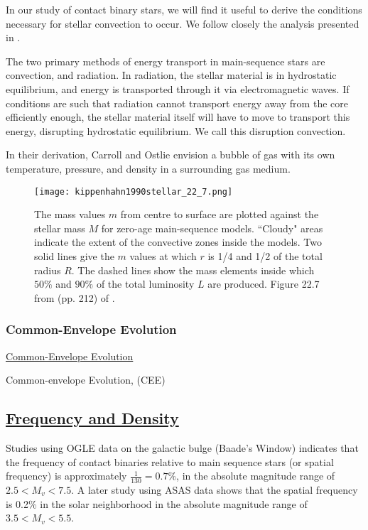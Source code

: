 \documentclass[12pt]{article} %
\numberwithin{equation}{section} %
\begin{document}
In our study of contact binary stars, we will find it useful to derive the conditions necessary for stellar convection to occur. We follow closely the analysis presented in \citet{carroll2006introduction}.

The two primary methods of energy transport in main-sequence stars are convection, and radiation. In radiation, the stellar material is in hydrostatic equilibrium, and energy is transported through it via electromagnetic waves. If conditions are such that radiation cannot transport energy away from the core efficiently enough, the stellar material itself will have to move to transport this energy, disrupting hydrostatic equilibrium. We call this disruption convection. 

In their derivation, Carroll and Ostlie envision a bubble of gas with its own temperature, pressure, and density in a surrounding gas medium. 

\begin{figure}[H]
\centering
\texttt{[image: kippenhahn1990stellar\_22\_7.png]}
\caption{The mass values $m$ from centre to surface are plotted against the stellar mass $M$ for zero-age main-sequence models. ``Cloudy" areas indicate the extent of the convective zones inside the models. Two solid lines give the $m$ values at which $r$ is 1/4 and 1/2 of the total radius $R$. The dashed lines show the mass elements inside which $50\%$ and $90\%$ of the total luminosity $L$ are produced. Figure 22.7 from (pp. 212) of \citet{kippenhahn1990stellar}.}
\label{fig: kippenhahn1990stellar_22_7}
\end{figure}

\subsubsection{Common-Envelope Evolution}{\hyperlink{toc}{Common-Envelope Evolution}} \label{sec: Common-Envelope Evolution}

Common-envelope Evolution, (CEE) \citep{ivanova2013common}

\subsection[Frequency and Density]{\hyperlink{toc}{Frequency and Density}}

 \citep{rucinski1998contact} Studies using OGLE data on the galactic bulge (Baade's Window) indicates that the frequency of contact binaries relative to main sequence stars (or spatial frequency) is approximately $\frac{1}{130} = 0.7\%$, in the absolute magnitude range of $2.5 < M_{v} < 7.5$. A later study using ASAS data shows that the spatial frequency is 0.2\% in the solar neighborhood \citep{rucinski2006luminosity} in the absolute magnitude range of $3.5 < M_{v} < 5.5$.
\end{document}

